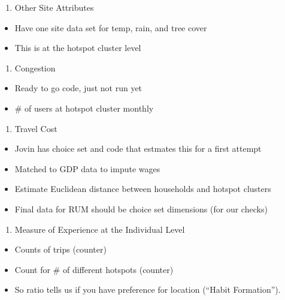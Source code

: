 \documentclass[
  letterpaper,
]{article}
\providecommand{\tightlist}{%
  \setlength{\itemsep}{0pt}\setlength{\parskip}{0pt}}\usepackage{longtable,booktabs,array}
\begin{document}
\begin{tcolorbox}
\begin{enumerate}
\def\labelenumi{\arabic{enumi}.}
\setcounter{enumi}{1}
\tightlist
\item
  Other Site Attributes
\end{enumerate}

\begin{itemize}
\tightlist
\item
  Have one site data set for temp, rain, and tree cover
\item
  This is at the hotspot cluster level
\end{itemize}

\begin{enumerate}
\def\labelenumi{\arabic{enumi}.}
\setcounter{enumi}{2}
\tightlist
\item
  Congestion
\end{enumerate}

\begin{itemize}
\tightlist
\item
  Ready to go code, just not run yet
\item
  \# of users at hotspot cluster monthly
\end{itemize}

\begin{enumerate}
\def\labelenumi{\arabic{enumi}.}
\setcounter{enumi}{3}
\tightlist
\item
  Travel Cost
\end{enumerate}

\begin{itemize}
\tightlist
\item
  Jovin has choice set and code that estmates this for a first attempt
\item
  Matched to GDP data to impute wages
\item
  Estimate Euclidean distance between households and hotspot clusters
\item
  Final data for RUM should be choice set dimensions (for our checks)
\end{itemize}

\begin{enumerate}
\def\labelenumi{\arabic{enumi}.}
\setcounter{enumi}{4}
\tightlist
\item
  Measure of Experience at the Individual Level
\end{enumerate}

\begin{itemize}
\tightlist
\item
  Counts of trips (counter)
\item
  Count for \# of different hotspots (counter)
\item
  So ratio tells us if you have preference for location (``Habit
  Formation'').


\end{itemize}
\end{tcolorbox}
\end{document}
